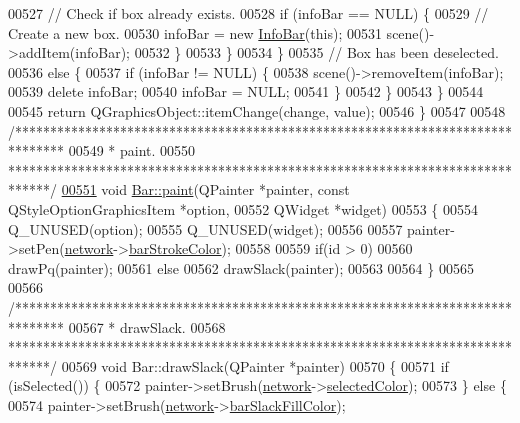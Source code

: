 \begin{DoxyCode}
00527         \textcolor{comment}{// Check if box already exists.}
00528         \textcolor{keywordflow}{if} (infoBar == NULL) \{
00529           \textcolor{comment}{// Create a new box.}
00530           infoBar = \textcolor{keyword}{new} \hyperlink{class_info_bar}{InfoBar}(\textcolor{keyword}{this});
00531           scene()->addItem(infoBar);
00532         \}
00533       \}
00534     \}
00535     \textcolor{comment}{// Box has been deselected.}
00536     \textcolor{keywordflow}{else} \{
00537       \textcolor{keywordflow}{if} (infoBar != NULL) \{
00538         scene()->removeItem(infoBar);
00539         \textcolor{keyword}{delete} infoBar;
00540         infoBar = NULL;
00541       \}
00542     \}
00543   \}
00544 
00545   \textcolor{keywordflow}{return} QGraphicsObject::itemChange(change, value);
00546 \}
00547 
00548 \textcolor{comment}{/*******************************************************************************}
00549 \textcolor{comment}{ * paint.}
00550 \textcolor{comment}{ ******************************************************************************/}
\hypertarget{bar_8cpp_source_l00551}{}\hyperlink{group___models_gacbb6dbac607412c9c1f9dfcd0cd4d432}{00551} \textcolor{keywordtype}{void} \hyperlink{group___models_gacbb6dbac607412c9c1f9dfcd0cd4d432}{Bar::paint}(QPainter *painter, \textcolor{keyword}{const} QStyleOptionGraphicsItem *option,
00552                 QWidget *widget)
00553 \{
00554   Q\_UNUSED(option);
00555   Q\_UNUSED(widget);
00556 
00557   painter->setPen(\hyperlink{class_bar_a80025f13884750add58cc61b318357ff}{network}->\hyperlink{class_network_ad69052271ab0a9899948815b6201f2c6}{barStrokeColor});
00558 
00559   \textcolor{keywordflow}{if}(\textcolor{keywordtype}{id} > 0)
00560     drawPq(painter);
00561   \textcolor{keywordflow}{else}
00562     drawSlack(painter);
00563 
00564 \}
00565 
00566 \textcolor{comment}{/*******************************************************************************}
00567 \textcolor{comment}{ * drawSlack.}
00568 \textcolor{comment}{ ******************************************************************************/}
00569 \textcolor{keywordtype}{void} Bar::drawSlack(QPainter *painter)
00570 \{
00571   \textcolor{keywordflow}{if} (isSelected()) \{
00572     painter->setBrush(\hyperlink{class_bar_a80025f13884750add58cc61b318357ff}{network}->\hyperlink{group___graphics_gaa9e21b8e2a24b0495e776a51e1aeed94}{selectedColor});
00573   \} \textcolor{keywordflow}{else} \{
00574     painter->setBrush(\hyperlink{class_bar_a80025f13884750add58cc61b318357ff}{network}->\hyperlink{class_network_ad78d9a206daf4ba0780067b5043c7f5c}{barSlackFillColor});

\end{DoxyCode}
